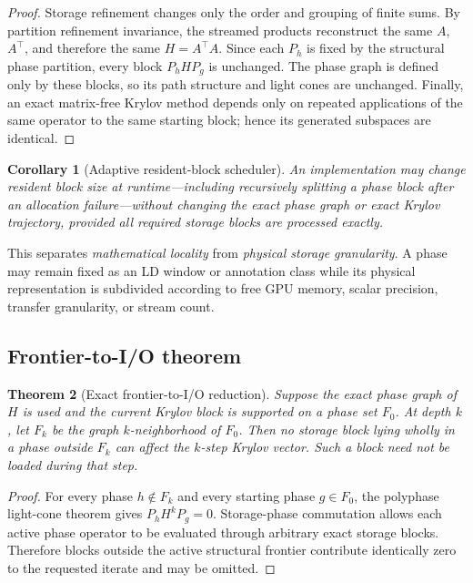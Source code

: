 \documentclass[11pt]{article}
\newtheorem{theorem}{Theorem}[section]
\newtheorem{corollary}[theorem]{Corollary}
\theoremstyle{definition}
\theoremstyle{remark}
\begin{document}
\begin{proof}
Storage refinement changes only the order and grouping of finite sums.
By partition refinement invariance, the streamed products reconstruct the
same $A$, $A^\top$, and therefore the same $H=A^\top A$.  Since each
$P_h$ is fixed by the structural phase partition, every block
$P_hHP_g$ is unchanged.  The phase graph is defined only by these blocks, so
its path structure and light cones are unchanged.  Finally, an exact
matrix-free Krylov method depends only on repeated applications of the same
operator to the same starting block; hence its generated subspaces are
identical.
\end{proof}

\begin{corollary}[Adaptive resident-block scheduler]
An implementation may change resident block size at runtime---including
recursively splitting a phase block after an allocation failure---without
changing the exact phase graph or exact Krylov trajectory, provided all
required storage blocks are processed exactly.
\end{corollary}

This separates \emph{mathematical locality} from \emph{physical storage
granularity}.  A phase may remain fixed as an LD window or annotation class
while its physical representation is subdivided according to free GPU
memory, scalar precision, transfer granularity, or stream count.

\subsection{Frontier-to-I/O theorem}

\begin{theorem}[Exact frontier-to-I/O reduction]
Suppose the exact phase graph of $H$ is used and the current Krylov block is
supported on a phase set $F_0$.  At depth $k$, let $F_k$ be the graph
$k$-neighborhood of $F_0$.  Then no storage block lying wholly in a phase
outside $F_k$ can affect the $k$-step Krylov vector.  Such a block need not be
loaded during that step.
\end{theorem}

\begin{proof}
For every phase $h\notin F_k$ and every starting phase $g\in F_0$, the
polyphase light-cone theorem gives $P_hH^kP_g=0$.  Storage-phase commutation
allows each active phase operator to be evaluated through arbitrary exact
storage blocks.  Therefore blocks outside the active structural frontier
contribute identically zero to the requested iterate and may be omitted.
\end{proof}
\end{document}
